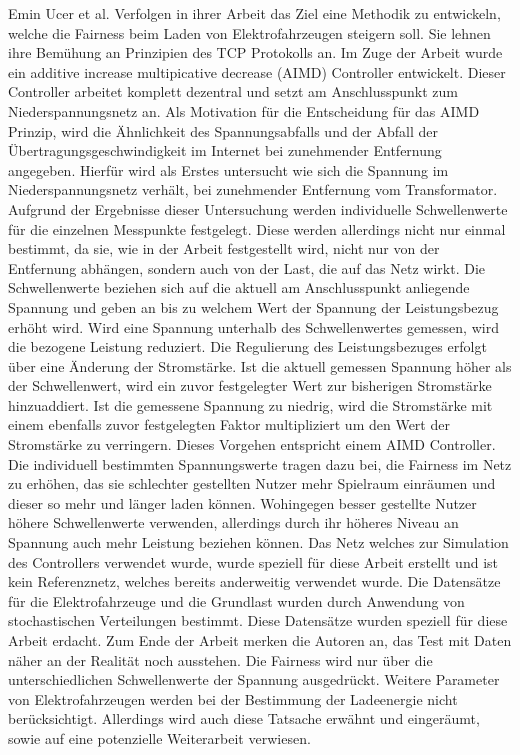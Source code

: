 Emin Ucer et al. Verfolgen in ihrer Arbeit \cite{RWTCP} das Ziel eine Methodik zu entwickeln, welche die Fairness beim Laden von Elektrofahrzeugen steigern soll. Sie lehnen ihre Bemühung an Prinzipien des TCP Protokolls an.  Im Zuge der Arbeit wurde ein additive increase multipicative decrease (AIMD) Controller entwickelt. Dieser Controller arbeitet komplett dezentral und setzt am Anschlusspunkt zum Niederspannungsnetz an. Als Motivation für die Entscheidung für das AIMD Prinzip, wird die Ähnlichkeit des Spannungsabfalls und der Abfall der Übertragungsgeschwindigkeit im Internet bei zunehmender Entfernung angegeben. Hierfür wird als Erstes untersucht wie sich die Spannung im Niederspannungsnetz verhält, bei zunehmender Entfernung vom Transformator. Aufgrund der Ergebnisse dieser Untersuchung werden individuelle Schwellenwerte für die einzelnen Messpunkte festgelegt. Diese werden allerdings nicht nur einmal bestimmt, da sie, wie in der Arbeit festgestellt wird, nicht nur von der Entfernung abhängen, sondern auch von der Last, die auf das Netz wirkt. Die Schwellenwerte beziehen sich auf die aktuell am Anschlusspunkt anliegende Spannung und geben an bis zu welchem Wert der Spannung der Leistungsbezug erhöht wird. Wird eine Spannung unterhalb des Schwellenwertes gemessen, wird die bezogene Leistung reduziert. Die Regulierung des Leistungsbezuges erfolgt über eine Änderung der Stromstärke. Ist die aktuell gemessen Spannung höher als der Schwellenwert, wird ein zuvor festgelegter Wert zur bisherigen Stromstärke hinzuaddiert. Ist die gemessene Spannung zu niedrig, wird die Stromstärke mit einem ebenfalls zuvor festgelegten Faktor multipliziert um den Wert der Stromstärke zu verringern. Dieses Vorgehen entspricht einem AIMD Controller. Die individuell bestimmten Spannungswerte tragen dazu bei, die Fairness im Netz zu erhöhen, das sie schlechter gestellten Nutzer mehr Spielraum einräumen und dieser so mehr und länger laden können. Wohingegen besser gestellte Nutzer höhere Schwellenwerte verwenden, allerdings durch ihr höheres Niveau an Spannung auch mehr Leistung beziehen können. Das Netz welches zur Simulation des Controllers verwendet wurde, wurde speziell für diese Arbeit erstellt und ist kein Referenznetz, welches bereits anderweitig verwendet wurde. Die Datensätze für die Elektrofahrzeuge und die Grundlast wurden durch Anwendung von stochastischen Verteilungen bestimmt. Diese Datensätze wurden speziell für diese Arbeit erdacht. Zum Ende der Arbeit merken die Autoren an, das Test mit Daten näher an der Realität noch ausstehen. Die Fairness wird nur über die unterschiedlichen Schwellenwerte der Spannung ausgedrückt. Weitere Parameter von Elektrofahrzeugen werden bei der Bestimmung der Ladeenergie nicht berücksichtigt. Allerdings wird auch diese Tatsache erwähnt und eingeräumt, sowie auf eine potenzielle Weiterarbeit verwiesen. 
